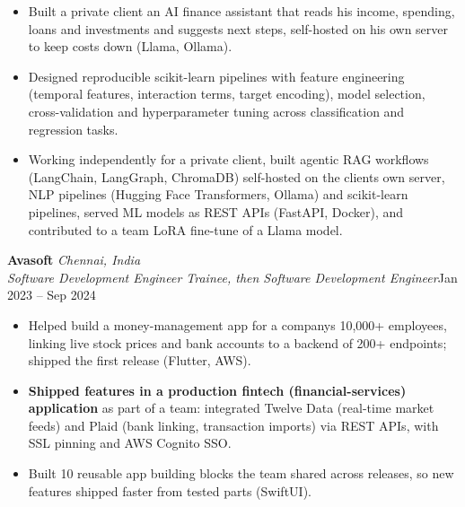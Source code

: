 \documentclass[a4paper,11pt]{article}
\newcommand{\role}[4]{%
  \textbf{#1}{\color{muted}\,\textperiodcentered\,\textit{#2}}\\
  \textit{#4}\hfill{\color{muted}#3}\par}
\newcommand{\gap}{\vspace{5pt}}
\newcommand{\num}[1]{\textbf{#1}}   %
\begin{document}
\begin{itemize}
  \item Built a private client an AI finance assistant that reads his income, spending, loans and investments and suggests next steps, self-hosted on his own server to keep costs down (Llama, Ollama).
  \item Designed reproducible scikit-learn pipelines with feature engineering (temporal features, interaction terms, target encoding), model selection, cross-validation and hyperparameter tuning across classification and regression tasks.
  \item Working independently for a private client, built agentic RAG workflows (LangChain, LangGraph, ChromaDB) self-hosted on the client\textquotesingle{}s own server, NLP pipelines (Hugging Face Transformers, Ollama) and scikit-learn pipelines, served ML models as REST APIs (FastAPI, Docker), and contributed to a team LoRA fine-tune of a Llama model.
\end{itemize}
\gap
{}
\role{Avasoft}{Chennai, India}{Jan 2023 – Sep 2024}{Software Development Engineer Trainee, then Software Development Engineer}
\begin{itemize}
  \item Helped build a money-management app for a company\textquotesingle{}s 10,000+ employees, linking live stock prices and bank accounts to a backend of 200+ endpoints; shipped the first release (Flutter, AWS).
  \item \num{Shipped features in a production fintech (financial-services) application} as part of a team: integrated Twelve Data (real-time market feeds) and Plaid (bank linking, transaction imports) via REST APIs, with SSL pinning and AWS Cognito SSO.
  \item Built 10 reusable app building blocks the team shared across releases, so new features shipped faster from tested parts (SwiftUI).
\end{itemize}
\end{document}
